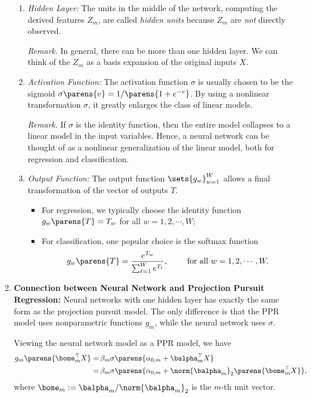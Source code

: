 \documentclass[12pt]{article}
\begin{document}
\begin{enumerate}[label=\textbf{\arabic*.}]
\begin{enumerate}
		\item \textit{Hidden Layer:} The units in the middle of the network, computing the derived features $Z_m$, are called \textit{hidden units} because $Z_m$ are \emph{not} directly observed. 
		
		\textit{Remark.} In general, there can be more than one hidden layer. We can think of the $Z_m$ as a basis expansion of the original inputs $X$. 
		
		\item \textit{Activation Function:} The activation function $\sigma$ is usually chosen to be the sigmoid $\sigma \parens{v} = 1/ \parens{1 + e^{-v}}$. By using a nonlinear transformation $\sigma$, it greatly enlarges the class of linear models. 
		
		\textit{Remark.} If $\sigma$ is the identity function, then the entire model collapses to a linear model in the input variables. Hence, a neural network can be thought of as a nonlinear generalization of the linear model, both for regression and classification. 
		
		\item \textit{Output Function:} The output function $\sets{g_w}_{w=1}^W$ allows a final transformation of the vector of outputs $T$. 
		\begin{itemize}
			\item For regression, we typically choose the identity function $g_w \parens{T} = T_w$ for all $w = 1, 2, \cdots, W$; 
			\item For classification, one popular choice is the softmax function 
			\begin{align}
				g_w \parens{T} = \frac{e^{T_w}}{\sum_{\ell=1}^W e^{T_{\ell}}}, \qquad \text{ for all } w = 1, 2, \cdots, W. 
			\end{align}
		\end{itemize}
		
	\end{enumerate}
	
	\item \textbf{Connection between Neural Network and Projection Pursuit Regression:} Neural networks with one hidden layer has exactly the same form as the projection pursuit model. The only difference is that the PPR model uses nonparametric functions $g_m$, while the neural network uses $\sigma$. 
	
	Viewing the neural network model as a PPR model, we have 
	\begin{align}
		g_m \parens{\bome_m^\top X} = & \, \beta_m \sigma \parens{\alpha_{0,m} + \balpha_m^\top X} \nonumber \\ 
		= & \, \beta_m \sigma \parens{\alpha_{0,m} + \norm{\balpha_m}_2 \parens{\bome_m^\top X}}, 
	\end{align}
	where $\bome_m := \balpha_m / \norm{\balpha_m}_2$ is the $m$-th unit vector. 

\end{enumerate}
\end{document}
